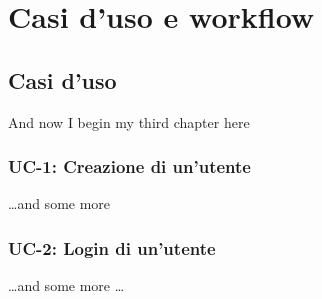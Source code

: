 \chapter{Casi d'uso e workflow}

\section{Casi d'uso}
And now I begin my third chapter here 

\subsection{UC-1: Creazione di un'utente}
\dots and some more 

\subsection{UC-2: Login di un'utente}
\dots and some more \dots
